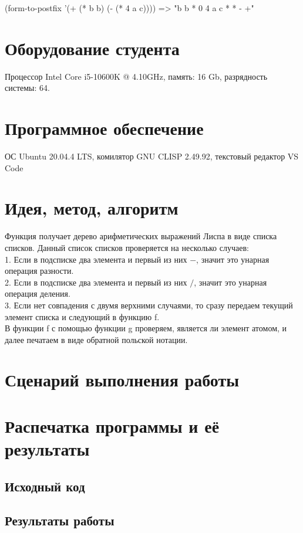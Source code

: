 \documentclass[12pt]{article}
\begin{document}
(form-to-postfix '(+ (* b b) (- (* 4 a c)))) => "b b * 0 4 a c * * - +"\\


\section{Оборудование студента}
Процессор Intel Core i5-10600K @ 4.10GHz, память: 16 Gb, разрядность системы: 64.

\section{Программное обеспечение}
ОС Ubuntu 20.04.4 LTS, комилятор GNU CLISP 2.49.92, текстовый редактор VS Code

\pagebreak
\section{Идея, метод, алгоритм}
Функция получает дерево арифметических выражений Лиспа в виде списка списков. Данный список списков проверяется на несколько случаев:\\
1. Если в подсписке два элемента и первый из них $-$, значит это унарная операция разности.\\
2. Если в подсписке два элемента и первый из них $/$, значит это унарная операция деления.\\
3. Если нет совпадения с двумя верхними случаями, то сразу передаем текущий элемент списка и следующий в функцию f.\\

В функции f с помощью функции g проверяем, является ли элемент атомом, и далее печатаем в виде обратной польской нотации.\\


\section{Сценарий выполнения работы}

\section{Распечатка программы и её результаты}

\subsection{Исходный код}


\pagebreak
\subsection{Результаты работы}

\end{document}

